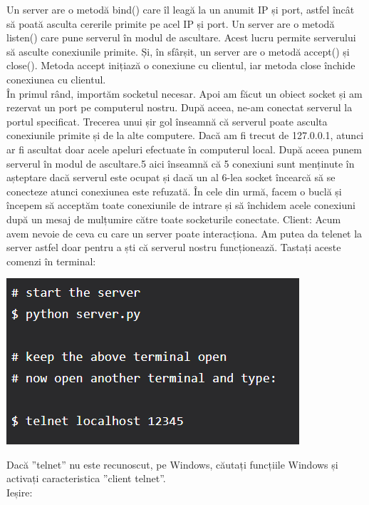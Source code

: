 \documentclass[oneside,20pt]{article}          %
\begin{document}
Un server are o metodă bind() care îl leagă la un anumit IP și port, astfel încât să poată asculta cererile primite pe acel IP și port. Un server are o metodă listen() care pune serverul în modul de ascultare. Acest lucru permite serverului să asculte conexiunile primite. Și, în sfârșit, un server are o metodă accept() și close(). Metoda accept inițiază o conexiune cu clientul, iar metoda close închide conexiunea cu clientul.\\
În primul rând, importăm socketul necesar.
Apoi am făcut un obiect socket și am rezervat un port pe computerul nostru.
După aceea, ne-am conectat serverul la portul specificat. Trecerea unui șir gol înseamnă că serverul poate asculta conexiunile primite și de la alte computere. Dacă am fi trecut de 127.0.0.1, atunci ar fi ascultat doar acele apeluri efectuate în computerul local.
După aceea punem serverul în modul de ascultare.5 aici înseamnă că 5 conexiuni sunt menținute în așteptare dacă serverul este ocupat și dacă un al 6-lea socket încearcă să se conecteze atunci conexiunea este refuzată.
În cele din urmă, facem o buclă și începem să acceptăm toate conexiunile de intrare și să închidem acele conexiuni după un mesaj de mulțumire către toate socketurile conectate.
Client:
Acum avem nevoie de ceva cu care un server poate interacționa. Am putea da telenet la server astfel doar pentru a ști că serverul nostru funcționează. Tastați aceste comenzi în terminal:
 \begin{center}
\includegraphics[height = 5 cm]{4.png}
\end{center}

Dacă ”telnet” nu este recunoscut, pe Windows, căutați funcțiile Windows și activați caracteristica ”client telnet”.\\
Ieșire:\\
\end{document}
